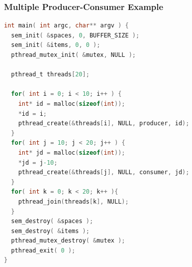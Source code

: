 \begin{frame}[fragile]
\frametitle{Multiple Producer-Consumer Example}
\begin{lstlisting}[language=C]
int main( int argc, char** argv ) {
  sem_init( &spaces, 0, BUFFER_SIZE );
  sem_init( &items, 0, 0 );  
  pthread_mutex_init( &mutex, NULL );

  pthread_t threads[20];

  for( int i = 0; i < 10; i++ ) {
    int* id = malloc(sizeof(int));
    *id = i;
    pthread_create(&threads[i], NULL, producer, id);
  }
  for( int j = 10; j < 20; j++ ) {
    int* jd = malloc(sizeof(int));
    *jd = j-10;
    pthread_create(&threads[j], NULL, consumer, jd);
  }
  for( int k = 0; k < 20; k++ ){  
    pthread_join(threads[k], NULL);
  }
  sem_destroy( &spaces );
  sem_destroy( &items );
  pthread_mutex_destroy( &mutex );
  pthread_exit( 0 );
}
\end{lstlisting}
\end{frame}





